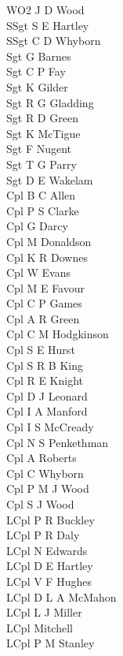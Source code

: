 \begin{multicols}{4}
  \scriptsize
  \noindent
  WO2 J D Wood \\
  SSgt S E Hartley \\
  SSgt C D Whyborn \\
  Sgt G Barnes \\
  Sgt C P Fay \\
  Sgt K Gilder \\
  Sgt R G Gladding \\
  Sgt R D Green \\
  Sgt K McTigue \\
  Sgt F Nugent \\
  Sgt T G Parry \\
  Sgt D E Wakelam \\
  Cpl B C Allen \\
  Cpl P S Clarke \\
  Cpl G Darcy \\
  Cpl M Donaldson \\
  Cpl K R Downes \\
  Cpl W Evans \\
  Cpl M E Favour \\
  Cpl C P Games \\
  Cpl A R Green \\
  Cpl C M Hodgkinson \\
  Cpl S E Hurst \\
  Cpl S R B King \\
  Cpl R E Knight \\
  Cpl D J Leonard \\
  Cpl I A Manford \\
  Cpl I S McCready \\
  Cpl N S Penkethman \\
  Cpl A Roberts \\
  Cpl C Whyborn \\
  Cpl P M J Wood \\
  Cpl S J Wood \\
  LCpl P R Buckley \\
  LCpl P R Daly \\
  LCpl N Edwards \\
  LCpl D E Hartley \\
  LCpl V F Hughes \\
  LCpl D L A McMahon \\
  LCpl L J Miller \\
  LCpl Mitchell \\
  LCpl P M Stanley \\

\end{multicols}
